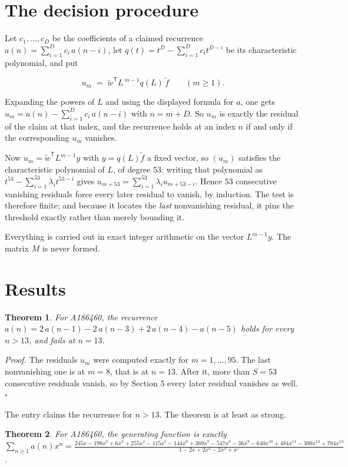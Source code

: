 \documentclass[11pt]{article}
\newtheorem{theorem}{Theorem}
\theoremstyle{definition}
\begin{document}
\section{The decision procedure}

Let $c_1,\dots,c_D$ be the coefficients of a claimed recurrence $a(n) = \sum_{i=1}^{D} c_i\,a(n-i)$, let $q(t) = t^{D} - \sum_{i=1}^{D} c_i t^{D-i}$ be its characteristic polynomial, and put

\[u_m \;=\; \tilde w^{\mathsf T} L^{\,m-1} q(L)\,\tilde f \qquad (m \ge 1).\]

Expanding the powers of $L$ and using the displayed formula for $a$, one gets $u_m = a(n) - \sum_{i=1}^{D} c_i\,a(n-i)$ with $n = m + D$. So $u_m$ is exactly the residual of the claim at that index, and the recurrence holds at an index $n$ if and only if the corresponding $u_m$ vanishes.

Now $u_m = \tilde w^{\mathsf T} L^{m-1} y$ with $y = q(L)\tilde f$ a fixed vector, so $(u_m)$ satisfies the characteristic polynomial of $L$, of degree $53$: writing that polynomial as $t^{53} - \sum_{i=1}^{53} \lambda_i t^{53-i}$ gives $u_{m+53} = \sum_{i=1}^{53} \lambda_i u_{m+53-i}$. Hence $53$ consecutive vanishing residuals force every later residual to vanish, by induction. The test is therefore finite; and because it locates the {\itshape last} nonvanishing residual, it pins the threshold exactly rather than merely bounding it.

Everything is carried out in exact integer arithmetic on the vector $L^{m-1}y$. The matrix $M$ is never formed.

\section{Results}

\begin{theorem} For A186460, the recurrence $a(n) = 2\,a(n-1) - 2\,a(n-3) + 2\,a(n-4) - a(n-5)$ holds for every $n > 13$, and fails at $n = 13$.\end{theorem}

{\itshape Proof.} The residuals $u_m$ were computed exactly for $m = 1,\dots,95$. The last nonvanishing one is at $m = 8$, that is at $n = 13$. After it, more than $S = 53$ consecutive residuals vanish, so by Section 5 every later residual vanishes as well. $\square$

The entry claims the recurrence for $n > 13$. The theorem is at least as strong.

\begin{theorem} For A186460, the generating function is exactly $\sum_{n\ge 1} a(n)x^n = \frac{245x - 198x^{2} + 6x^{3} + 255x^{4} - 115x^{5} - 144x^{6} + 369x^{7} - 547x^{8} - 36x^{9} - 640x^{10} + 484x^{11} - 300x^{12} + 784x^{13}}{1 - 2x + 2x^{3} - 2x^{4} + x^{5}}$.\end{theorem}
\end{document}
